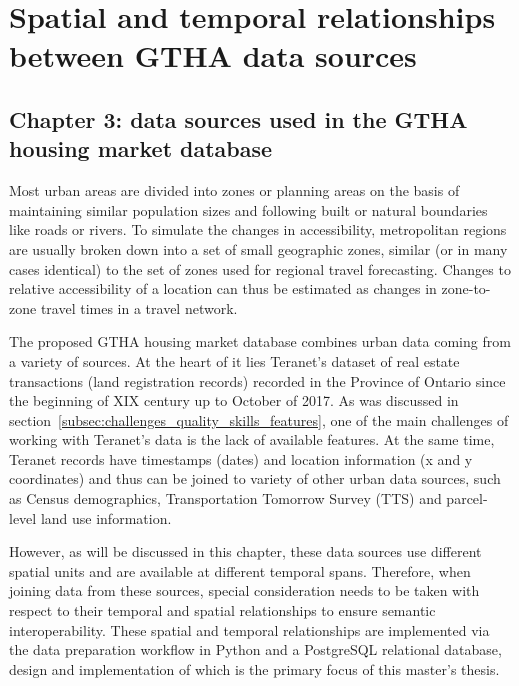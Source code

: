 \chapter{Spatial and temporal relationships between GTHA data sources} \label{ch:spatial_and_temporal_relationships_between_urban_data}

\section{Chapter 3: data sources used in the GTHA housing market database} \label{sec:chapter_3_intro}
Most urban areas are divided into zones or planning areas on the basis of maintaining similar population sizes and following built or natural boundaries like roads or rivers.
To simulate the changes in accessibility, metropolitan regions are usually broken down into a set of small geographic zones, similar (or in many cases identical) to the set of zones used for regional travel forecasting.
Changes to relative accessibility of a location can thus be estimated as changes in zone-to-zone travel times in a travel network\cite{Iacono2008}.


The proposed GTHA housing market database combines urban data coming from a variety of sources.
At the heart of it lies Teranet's dataset of real estate transactions (land registration records) recorded in the Province of Ontario since the beginning of XIX century up to October of 2017.
As was discussed in section~\ref{subsec:challenges_quality_skills_features}, one of the main challenges of working with Teranet's data is the lack of available features.
At the same time, Teranet records have timestamps (dates) and location information (x and y coordinates) and thus can be joined to variety of other urban data sources, such as Census demographics, Transportation Tomorrow Survey (TTS) and parcel-level land use information.

However, as will be discussed in this chapter, these data sources use different spatial units and are available at different temporal spans.
Therefore, when joining data from these sources, special consideration needs to be taken with respect to their temporal and spatial relationships to ensure semantic interoperability.
These spatial and temporal relationships are implemented via the data preparation workflow in Python and a PostgreSQL relational database, design and implementation of which is the primary focus of this master's thesis.

